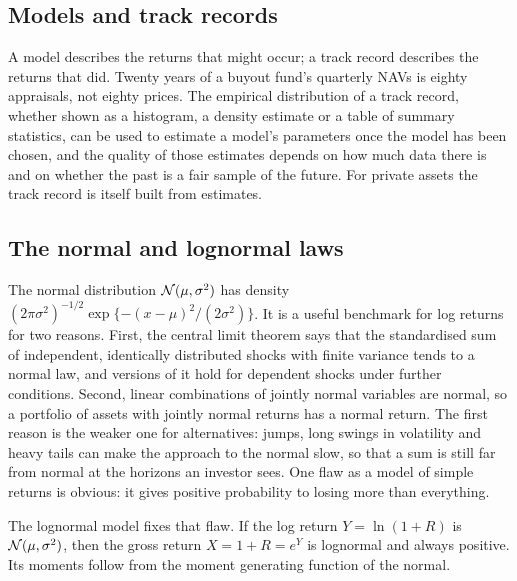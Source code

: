 \begin{chapterrefs}
\FloatBarrier
\section{Models and track records}
\label{sec:distributions}

A model describes the returns that might occur; a track record describes the returns that did.
Twenty years of a buyout fund's quarterly NAVs is eighty appraisals, not eighty prices. The
empirical distribution of a track record, whether shown as a histogram, a density estimate or a
table of summary statistics, can be used to estimate a model's parameters once the model has been
chosen, and the quality of those estimates depends
on how much data there is and on whether the past is a fair sample of the future. For private
assets the track record is itself built from estimates.

\subsection{The normal and lognormal laws}

The normal distribution $\mathcal{N}(\mu,\sigma^2)$ has density
$(2\pi\sigma^2)^{-1/2}\exp\{-(x-\mu)^2/(2\sigma^2)\}$. It is a useful benchmark for log returns for two
reasons. First, the central limit theorem says that the standardised sum of independent, identically distributed
shocks with finite variance tends to a normal law, and versions of it hold for dependent shocks under
further conditions. Second, linear combinations of jointly normal variables are normal, so a portfolio of assets
with jointly normal returns has a normal return. The first reason is the
weaker one for alternatives: jumps, long swings in volatility and heavy tails can make the approach to
the normal slow, so that a sum is still far from normal at the horizons an investor sees. One
flaw as a model of simple returns is obvious: it gives positive probability to losing more than
everything.

The lognormal model fixes that flaw. If the log return $Y = \ln(1+R)$ is $\mathcal{N}(\mu,\sigma^2)$, then the
gross return $X = 1+R = e^Y$ is lognormal and always positive. Its moments follow from the moment
generating function of the normal.


\end{chapterrefs}
